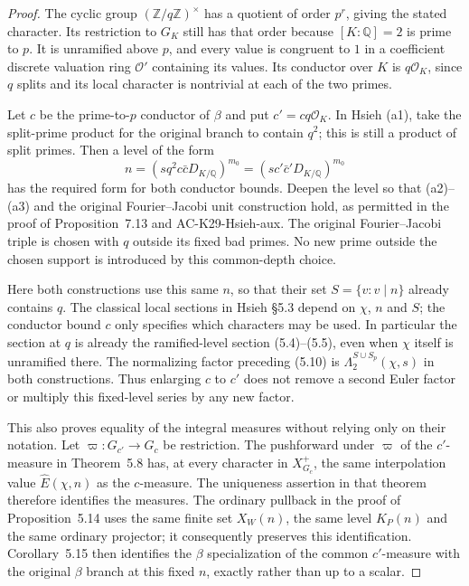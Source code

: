\begin{proof}
The cyclic group $(\mathbb Z/q\mathbb Z)^\times$ has a quotient
of order $p^r$, giving the stated character.  Its restriction
to $G_K$ still has that order because $[K:\mathbb Q]=2$ is
prime to $p$.  It is unramified above $p$, and every value is
congruent to $1$ in a coefficient discrete valuation ring
$\mathcal O'$ containing its values.  Its conductor over $K$
is $q\mathcal O_K$, since $q$ splits and its local character
is nontrivial at each of the two primes.

Let $c$ be the prime-to-$p$ conductor of $\beta$ and put
$c'=c q\mathcal O_K$.  In Hsieh (a1), take the split-prime
product for the original branch to contain $q^2$; this is
still a product of split primes.  Then a level of the form
\[
 n=(s q^2c\bar cD_{K/\mathbb Q})^{m_0}
   =(s c'\bar c'D_{K/\mathbb Q})^{m_0}
\]
has the required form for both conductor bounds.  Deepen the
level so that (a2)--(a3) and the original Fourier--Jacobi unit
construction hold, as permitted in the proof of Proposition~7.13
and AC-K29-Hsieh-aux.  The original Fourier--Jacobi triple is
chosen with $q$ outside its fixed bad primes.  No new prime
outside the chosen support is introduced by this common-depth
choice.

Here both constructions use this same $n$, so that their set
$S=\{v:v\mid n\}$ already contains $q$.  The classical local
sections in Hsieh \S5.3 depend on $\chi$, $n$ and $S$; the
conductor bound $c$ only specifies which characters may be
used.  In particular the section at $q$ is already the
ramified-level section (5.4)--(5.5), even when $\chi$ itself is
unramified there.  The normalizing factor preceding (5.10) is
$\Lambda_2^{S\cup S_p}(\chi,s)$ in both constructions.
Thus enlarging $c$ to $c'$ does not remove a second Euler
factor or multiply this fixed-level series by any new factor.

This also proves equality of the integral measures without
relying only on their notation.  Let $\varpi:G_{c'}\to G_c$
be restriction.  The pushforward under $\varpi$ of the
$c'$-measure in Theorem~5.8 has, at every character in
$X^+_{G_c}$, the same interpolation value $\widehat E(\chi,n)$
as the $c$-measure.  The uniqueness assertion in that theorem
therefore identifies the measures.  The ordinary pullback in
the proof of Proposition~5.14 uses the same finite set
$X_W(n)$, the same level $K_P(n)$ and the same ordinary
projector; it consequently preserves this identification.
Corollary~5.15 then identifies the $\beta$ specialization of
the common $c'$-measure with the original $\beta$ branch at
this fixed $n$, exactly rather than up to a scalar.


\end{proof}
